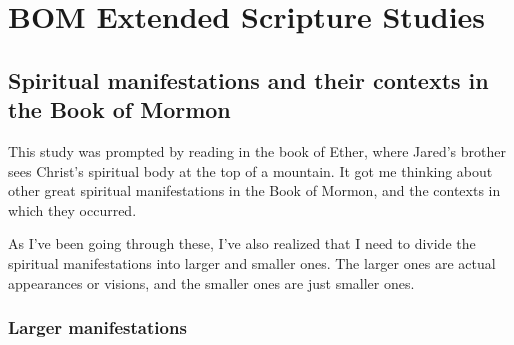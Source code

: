 \section{BOM Extended Scripture Studies}
	\label{EXSS-BOM}
	
	\subsection{Spiritual manifestations and their contexts in the Book of Mormon}
		\label{EXSS-BOM-SPIRIT-CONTEXTS}
		
		This study was prompted by reading in the book of Ether, where Jared's brother sees Christ's spiritual body at the top of a mountain. It got me thinking about other great spiritual manifestations in the Book of Mormon, and the contexts in which they occurred.
		
		As I've been going through these, I've also realized that I need to divide the spiritual manifestations into larger and smaller ones. The larger ones are actual appearances or visions, and the smaller ones are just smaller ones.
		
		\subsubsection{Larger manifestations}
			
			\scriptsize

